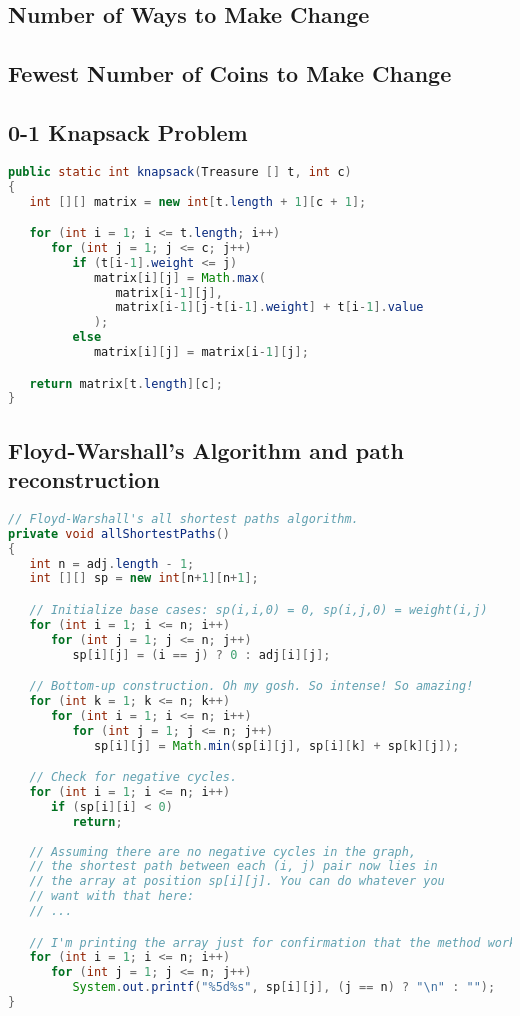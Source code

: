 \subsection*{Number of Ways to Make Change}
\lipsum[1][1-2]
\subsection*{Fewest Number of Coins to Make Change}
\lipsum[1][1-2]
\subsection*{0-1 Knapsack Problem}

\begin{lstlisting}[language=Java,basicstyle=\tiny]
public static int knapsack(Treasure [] t, int c)
{
   int [][] matrix = new int[t.length + 1][c + 1];

   for (int i = 1; i <= t.length; i++)
      for (int j = 1; j <= c; j++)
         if (t[i-1].weight <= j)
            matrix[i][j] = Math.max(
               matrix[i-1][j],
               matrix[i-1][j-t[i-1].weight] + t[i-1].value
            );
         else
            matrix[i][j] = matrix[i-1][j];

   return matrix[t.length][c];
}
\end{lstlisting}

\subsection*{Floyd-Warshall's Algorithm and path reconstruction}

\begin{lstlisting}[language=Java,basicstyle=\tiny]
// Floyd-Warshall's all shortest paths algorithm.
private void allShortestPaths()
{
   int n = adj.length - 1;
   int [][] sp = new int[n+1][n+1];

   // Initialize base cases: sp(i,i,0) = 0, sp(i,j,0) = weight(i,j)
   for (int i = 1; i <= n; i++)
      for (int j = 1; j <= n; j++)
         sp[i][j] = (i == j) ? 0 : adj[i][j];

   // Bottom-up construction. Oh my gosh. So intense! So amazing!
   for (int k = 1; k <= n; k++)
      for (int i = 1; i <= n; i++)
         for (int j = 1; j <= n; j++)
            sp[i][j] = Math.min(sp[i][j], sp[i][k] + sp[k][j]);

   // Check for negative cycles.
   for (int i = 1; i <= n; i++)
      if (sp[i][i] < 0)
         return;
		
   // Assuming there are no negative cycles in the graph,
   // the shortest path between each (i, j) pair now lies in
   // the array at position sp[i][j]. You can do whatever you
   // want with that here:
   // ...

   // I'm printing the array just for confirmation that the method works.
   for (int i = 1; i <= n; i++)
      for (int j = 1; j <= n; j++)
         System.out.printf("%5d%s", sp[i][j], (j == n) ? "\n" : "");
}
\end{lstlisting}


